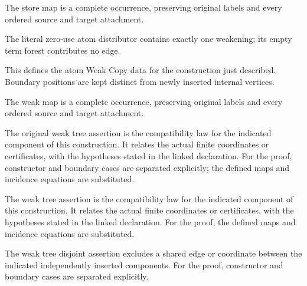 The store map is a complete occurrence, preserving original labels and every ordered source and target attachment.
\par{}

The literal zero-use atom distributor contains exactly one weakening; its empty term forest contributes no edge.
\par{}

This defines the atom Weak Copy data for the construction just described. Boundary positions are kept distinct from newly inserted internal vertices.
\par{}

The weak map is a complete occurrence, preserving original labels and every ordered source and target attachment.
\par{}

The original weak tree assertion is the compatibility law for the indicated component of this construction. It relates the actual finite coordinates or certificates, with the hypotheses stated in the linked declaration.
For the proof, constructor and boundary cases are separated explicitly; the defined maps and incidence equations are substituted.
\par{}

The weak tree assertion is the compatibility law for the indicated component of this construction. It relates the actual finite coordinates or certificates, with the hypotheses stated in the linked declaration.
For the proof, the defined maps and incidence equations are substituted.
\par{}

The weak tree disjoint assertion excludes a shared edge or coordinate between the indicated independently inserted components.
For the proof, constructor and boundary cases are separated explicitly.
\par{}

